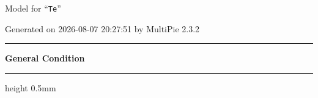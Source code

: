 \documentclass[fleqn,10pt,landscape]{jsarticle}
\begin{document}
\setcounter{MaxMatrixCols}{32}

\renewcommand{\tablename}{Table~}
\renewcommand{\figurename}{Figure~}
\setlength{\baselineskip}{16pt}
\setlength{\parindent}{0pt}
\setlength{\mathindent}{0pt}
\footnotesize
\begin{center}
\LARGE
Model for ``\texttt{Te}''
\end{center}
\begin{flushright}
Generated on 2026-08-07 20:27:51 by MultiPie 2.3.2
\end{flushright}
\setlength{\baselineskip}{16pt}
\footnotesize
\vspace{5mm}
\noindent \rule[0.5mm]{5mm}{0.5mm}\hspace{3mm}\textbf{General Condition}\hspace{3mm}\leaders\hrule height 0.5mm\hfill\kern0pt
\vspace{3mm}
\end{document}

